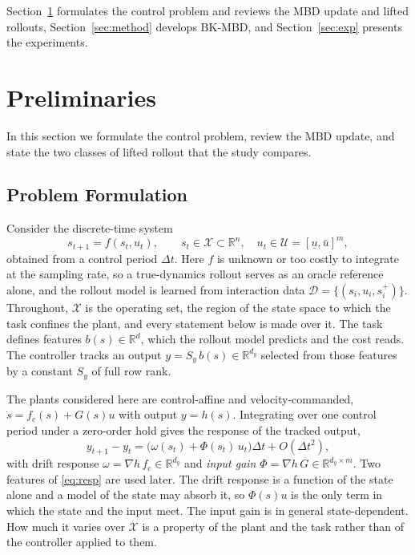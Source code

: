 \documentclass[letterpaper,10pt,conference]{ieeeconf}
\newcommand{\bkmbd}{\textsc{BK-MBD}}
\begin{document}
Section~\ref{sec:prelim} formulates the control problem and reviews the MBD update and lifted rollouts, Section~\ref{sec:method} develops \bkmbd{}, and Section~\ref{sec:exp} presents the experiments.

\section{Preliminaries}\label{sec:prelim}

In this section we formulate the control problem, review the MBD update, and state the two classes of lifted rollout that the study compares.

\subsection{Problem Formulation}\label{subsec:problem}

Consider the discrete-time system
\begin{equation}
s_{t+1} = f(s_t, u_t), \qquad
s_t \in \mathcal{X} \subset \mathbb{R}^{n},\quad
u_t \in \mathcal{U} = [\underline{u}, \bar{u}]^{m},
\label{eq:sys}
\end{equation}
obtained from a control period $\Delta t$.
Here $f$ is unknown or too costly to integrate at the sampling rate, so a true-dynamics rollout serves as an oracle reference alone, and the rollout model is learned from interaction data $\mathcal{D} = \{(s_i, u_i, s_i^{+})\}$.
Throughout, $\mathcal{X}$ is the operating set, the region of the state space to which the task confines the plant, and every statement below is made over it.
The task defines features $b(s) \in \mathbb{R}^{d}$, which the rollout model predicts and the cost reads.
The controller tracks an output $y = S_y\, b(s) \in \mathbb{R}^{d_y}$ selected from those features by a constant $S_y$ of full row rank.

The plants considered here are control-affine and velocity-commanded, $\dot{s} = f_c(s) + G(s)u$ with output $y = h(s)$.
Integrating over one control period under a zero-order hold gives the response of the tracked output,
\begin{equation}
y_{t+1} - y_t = \big(\omega(s_t) + \Phi(s_t)\, u_t\big)\Delta t + O(\Delta t^{2}),
\label{eq:resp}
\end{equation}
with drift response $\omega = \nabla h\, f_c \in \mathbb{R}^{d_y}$ and \emph{input gain} $\Phi = \nabla h\, G \in \mathbb{R}^{d_y \times m}$.
Two features of \eqref{eq:resp} are used later.
The drift response is a function of the state alone and a model of the state may absorb it, so $\Phi(s)u$ is the only term in which the state and the input meet.
The input gain is in general state-dependent.
How much it varies over $\mathcal{X}$ is a property of the plant and the task rather than of the controller applied to them.
\end{document}
